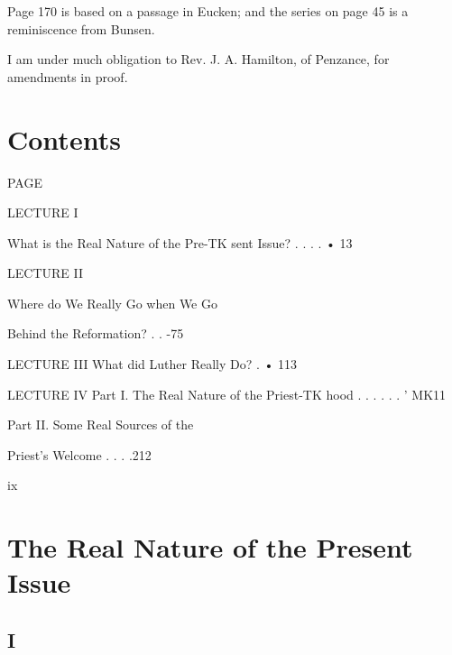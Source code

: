 \documentclass[12pt,a5paper,oneside]{book}
\begin{document}
Page 170 is based on a passage in Eucken; 
and the series on page 45 is a reminiscence 
from Bunsen. 

I am under much obligation to Rev. J. A. 
Hamilton, of Penzance, for amendments in 
proof. 

\chapter*{Contents} 

PAGE 

LECTURE I 

What is the Real Nature of the Pre-TK
sent Issue? . . . . • 13 

LECTURE II 

Where do We Really Go when We Go 

Behind the Reformation? . . -75 

LECTURE III 
What did Luther Really Do? . • 113 

LECTURE IV 
Part I. The Real Nature of the Priest-TK
hood . . . . . . ' MK11 

Part II. Some Real Sources of the 

Priest's Welcome . . . .212 

ix 



\chapter{The Real Nature of the Present Issue}

\section*{I}
\end{document}
